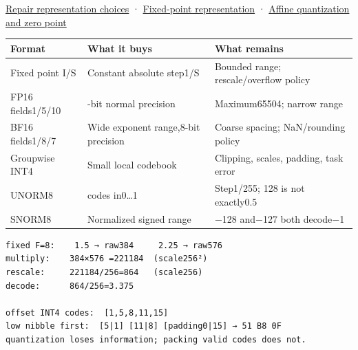 \href{Continuous\%20Notes/Computing\%20Foundations\%20-\%20From\%20Bits\%20to\%20C++\%20and\%20Systems\%20APIs\#Choosing\%20what\%20information\%20to\%20keep}{Repair representation choices} · \hyperref[appendix-1d0dbe8924cc]{Fixed-point representation} · \hyperref[appendix-d5da3eaabaef]{Affine quantization and zero point}

{\def\LTcaptype{none} %
\begin{longtable}[]{@{}
  >{\raggedright\arraybackslash}p{}
  >{\raggedright\arraybackslash}p{}
  >{\raggedright\arraybackslash}p{}@{}}
\toprule\noalign{}
\begin{minipage}[b]{\linewidth}\raggedright
Format
\end{minipage} & \begin{minipage}[b]{\linewidth}\raggedright
What it buys
\end{minipage} & \begin{minipage}[b]{\linewidth}\raggedright
What remains
\end{minipage} \\
\midrule\noalign{}
\endhead
\bottomrule\noalign{}
\endlastfoot
Fixed point I/S & Constant absolute step1/S & Bounded range; rescale/overflow policy \\
FP16 fields1/5/10 & 11-bit normal precision & Maximum65504; narrow range \\
BF16 fields1/8/7 & Wide exponent range,8-bit precision & Coarse spacing; NaN/rounding policy \\
Groupwise INT4 & Small local codebook & Clipping, scales, padding, task error \\
UNORM8 & 256 codes in0\ldots1 & Step1/255; 128 is not exactly0.5 \\
SNORM8 & Normalized signed range & −128 and−127 both decode−1 \\
\end{longtable}
}

\begin{verbatim}
fixed F=8:    1.5 → raw384     2.25 → raw576
multiply:    384×576 =221184  (scale256²)
rescale:     221184/256=864   (scale256)
decode:      864/256=3.375

offset INT4 codes:  [1,5,8,11,15]
low nibble first:  [5|1] [11|8] [padding0|15] → 51 B8 0F
quantization loses information; packing valid codes does not.
\end{verbatim}

